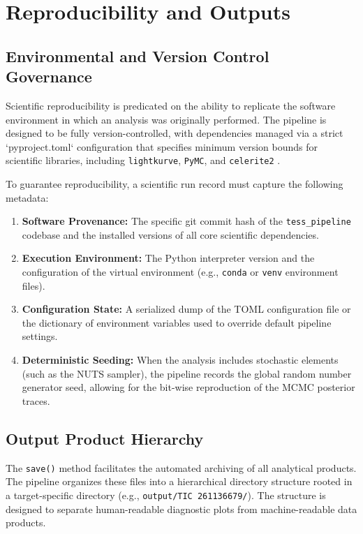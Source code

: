 \documentclass[12pt,a4paper,oneside]{report}
\newcommand{\code}[1]{\texttt{\small #1}}
\begin{document}
\chapter{Reproducibility and Outputs}

\section{Environmental and Version Control Governance}
Scientific reproducibility is predicated on the ability to replicate the software environment in which an analysis was originally performed. The pipeline is designed to be fully version-controlled, with dependencies managed via a strict `pyproject.toml` configuration that specifies minimum version bounds for scientific libraries, including \code{lightkurve}, \code{PyMC}, and \code{celerite2} \cite{tess_exoplanet_pipeline.zip:pyproject.toml}.

To guarantee reproducibility, a scientific run record must capture the following metadata:
\begin{enumerate}
    \item \textbf{Software Provenance:} The specific git commit hash of the \code{tess\_pipeline} codebase and the installed versions of all core scientific dependencies.
    \item \textbf{Execution Environment:} The Python interpreter version and the configuration of the virtual environment (e.g., \code{conda} or \code{venv} environment files).
    \item \textbf{Configuration State:} A serialized dump of the TOML configuration file or the dictionary of environment variables used to override default pipeline settings.
    \item \textbf{Deterministic Seeding:} When the analysis includes stochastic elements (such as the NUTS sampler), the pipeline records the global random number generator seed, allowing for the bit-wise reproduction of the MCMC posterior traces.
\end{enumerate}

\section{Output Product Hierarchy}
The \code{save()} method facilitates the automated archiving of all analytical products. The pipeline organizes these files into a hierarchical directory structure rooted in a target-specific directory (e.g., \code{output/TIC 261136679/}). The structure is designed to separate human-readable diagnostic plots from machine-readable data products.
\end{document}
